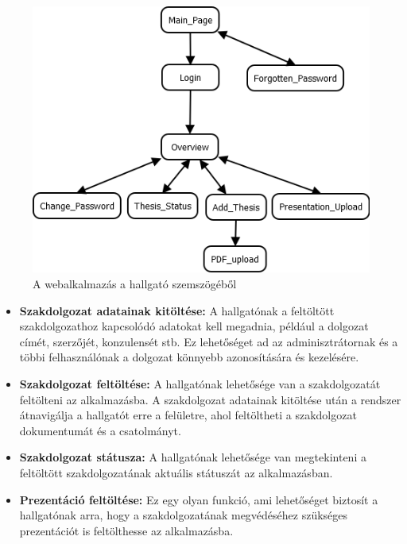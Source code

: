 \begin{figure}[h]
\centering
\includegraphics[scale=0.5]{images/Hallgato.png}
\caption{A webalkalmazás a hallgató szemszögéből}
\label{fig:hallgato}
\end{figure}

\begin{itemize}

\item \textbf{Szakdolgozat adatainak kitöltése:} A hallgatónak a feltöltött szakdolgozathoz kapcsolódó adatokat kell megadnia, például a dolgozat címét, szerzőjét, konzulensét stb. Ez lehetőséget ad az adminisztrátornak és a többi felhasználónak a dolgozat könnyebb azonosítására és kezelésére.

\item \textbf{Szakdolgozat feltöltése:} A hallgatónak lehetősége van a szakdolgozatát feltölteni az alkalmazásba. A szakdolgozat adatainak kitöltése után a rendszer átnavigálja a hallgatót erre a felületre, ahol feltöltheti a szakdolgozat dokumentumát és a csatolmányt.

\item \textbf{Szakdolgozat státusza:} A hallgatónak lehetősége van megtekinteni a feltöltött szakdolgozatának aktuális státuszát az alkalmazásban. 

\item \textbf{Prezentáció feltöltése:} Ez egy olyan funkció, ami lehetőséget biztosít a hallgatónak arra, hogy a szakdolgozatának megvédéséhez szükséges prezentációt is feltölthesse az alkalmazásba.


\end{itemize}


